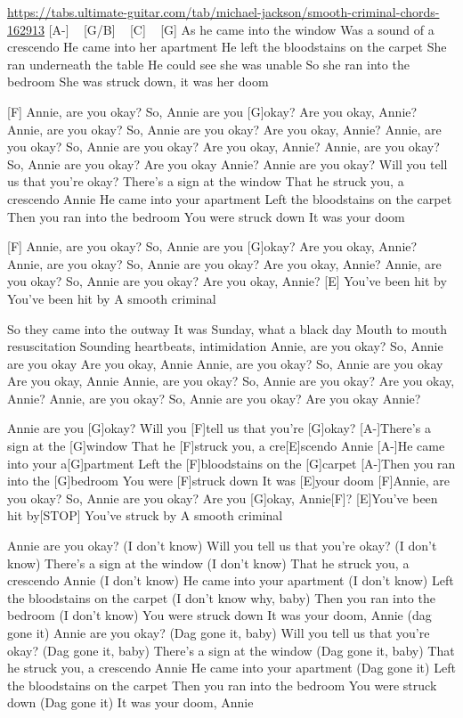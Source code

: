 \url{https://tabs.ultimate-guitar.com/tab/michael-jackson/smooth-criminal-chords-162913}
[A-] ~ [G/B] ~ [C] ~ [G]
As he came into the window
Was a sound of a crescendo
He came into her apartment
He left the bloodstains on the carpet
She ran underneath the table
He could see she was unable
So she ran into the bedroom
She was struck down, it was her doom

[F]
Annie, are you okay?
So, Annie are you [G]okay?
Are you okay, Annie?
Annie, are you okay?
So, Annie are you okay?
Are you okay, Annie?
Annie, are you okay?
So, Annie are you okay?
Are you okay, Annie?
Annie, are you okay?
So, Annie are you okay? Are you okay Annie?
Annie are you okay?
Will you tell us that you're okay?
There's a sign at the window
That he struck you, a crescendo Annie
He came into your apartment
Left the bloodstains on the carpet
Then you ran into the bedroom
You were struck down
It was your doom

[F]
Annie, are you okay?
So, Annie are you [G]okay?
Are you okay, Annie?
Annie, are you okay?
So, Annie are you okay?
Are you okay, Annie?
Annie, are you okay?
So, Annie are you okay?
Are you okay, Annie?
[E]
You've been hit by
You've been hit by
A smooth criminal


So they came into the outway
It was Sunday, what a black day
Mouth to mouth resuscitation
Sounding heartbeats, intimidation
Annie, are you okay?
So, Annie are you okay
Are you okay, Annie
Annie, are you okay?
So, Annie are you okay
Are you okay, Annie
Annie, are you okay?
So, Annie are you okay?
Are you okay, Annie?
Annie, are you okay?
So, Annie are you okay? Are you okay Annie?

Annie are you [G]okay?
Will you [F]tell us that you're [G]okay?
[A-]There's a sign at the [G]window
That he [F]struck you, a cre[E]scendo Annie
[A-]He came into your a[G]partment
Left the [F]bloodstains on the [G]carpet
[A-]Then you ran into the [G]bedroom
You were [F]struck down
It was [E]your doom
[F]Annie, are you okay?
So, Annie are you okay?
Are you [G]okay, Annie[F]?
[E]You've been hit by[STOP]
You've struck by
A smooth criminal


Annie are you okay?
(I don't know)
Will you tell us that you're okay?
(I don't know)
There's a sign at the window
(I don't know)
That he struck you, a crescendo Annie
(I don't know)
He came into your apartment
(I don't know)
Left the bloodstains on the carpet
(I don't know why, baby)
Then you ran into the bedroom
(I don't know)
You were struck down
It was your doom, Annie (dag gone it)
Annie are you okay?
(Dag gone it, baby)
Will you tell us that you're okay?
(Dag gone it, baby)
There's a sign at the window
(Dag gone it, baby)
That he struck you, a crescendo Annie
He came into your apartment
(Dag gone it)
Left the bloodstains on the carpet
Then you ran into the bedroom
You were struck down
(Dag gone it)
It was your doom, Annie